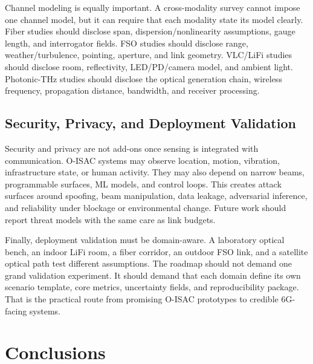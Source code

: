 \documentclass[letterpaper,journal]{IEEEtran}
\begin{document}
Channel modeling is equally important. A cross-modality survey cannot impose one channel model, but it can require that each modality state its model clearly. Fiber studies should disclose span, dispersion/nonlinearity assumptions, gauge length, and interrogator fields. FSO studies should disclose range, weather/turbulence, pointing, aperture, and link geometry. VLC/LiFi studies should disclose room, reflectivity, LED/PD/camera model, and ambient light. Photonic-THz studies should disclose the optical generation chain, wireless frequency, propagation distance, bandwidth, and receiver processing.

\subsection{Security, Privacy, and Deployment Validation}

Security and privacy are not add-ons once sensing is integrated with communication. O-ISAC systems may observe location, motion, vibration, infrastructure state, or human activity. They may also depend on narrow beams, programmable surfaces, ML models, and control loops. This creates attack surfaces around spoofing, beam manipulation, data leakage, adversarial inference, and reliability under blockage or environmental change. Future work should report threat models with the same care as link budgets.

Finally, deployment validation must be domain-aware. A laboratory optical bench, an indoor LiFi room, a fiber corridor, an outdoor FSO link, and a satellite optical path test different assumptions. The roadmap should not demand one grand validation experiment. It should demand that each domain define its own scenario template, core metrics, uncertainty fields, and reproducibility package. That is the practical route from promising O-ISAC prototypes to credible 6G-facing systems.


\section{Conclusions}
\label{sec:conclusion}
\end{document}
